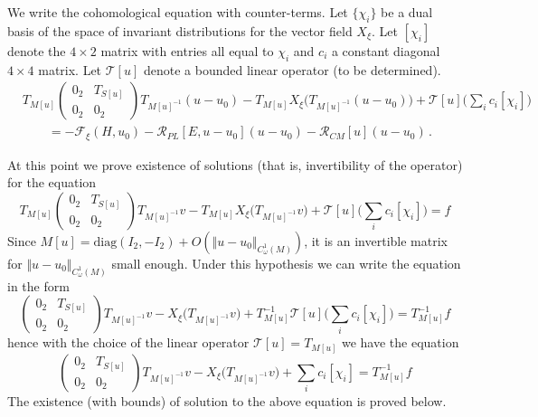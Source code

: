 \documentclass[11pt]{amsart}
\begin{document}
We write the cohomological equation with counter-terms. Let $\{\chi_i\}$ be a dual basis of the space of invariant distributions for the vector field $X_\xi$. 
Let $[\chi_i]$ denote the $4\times 2$ matrix with entries all equal to $\chi_i$ and $c_i$ a constant diagonal $4\times 4$ matrix.  Let  $\mathcal T[u]$
denote a bounded linear operator (to be determined).
\begin{equation}
\label{eq:para-cohom}
\begin{aligned}
&  T_{M[u]} \begin{pmatrix} 0_2 & T_{S[u]} \\ 0_2 & 0_2 \end{pmatrix} T_{M[u]^{-1}}  (u-u_0)  - 
T_{ M[u] } X_\xi \Big(T_{M[u]^{-1} }  (u-u_0) \Big)  + \mathcal T[u] \Big(  \sum_i  c_i [\chi_i]  \Big)  \\ &    
    \qquad = -\mathcal{F}_\xi(H, u_0) -\mathcal R_{PL}[E, u-u_0 ] (u-u_0) - \mathcal R_{CM}[u] (u-u_0)    \,.
\end{aligned}
\end{equation}

At this point we prove existence of solutions (that is, invertibility of the operator) for the equation
$$
 T_{M[u]} \begin{pmatrix} 0_2 & T_{S[u]} \\ 0_2 & 0_2 \end{pmatrix} T_{M[u]^{-1}}  v - 
T_{ M[u] } X_\xi \Big(T_{M[u]^{-1} }  v \Big)  + \mathcal T[u] \Big(  \sum_i  c_i [\chi_i]  \Big) = f
$$
Since $M[u]= \text{diag}(I_2, -I_2) + O( \Vert u -u_0 \Vert_{C^1_\omega(M)})$, it is an invertible matrix for $\Vert u -u_0 \Vert_{C^1_\omega(M)}$ small enough. 
Under this hypothesis we can write the equation in the form
$$
 \begin{pmatrix} 0_2 & T_{S[u]} \\ 0_2 & 0_2 \end{pmatrix} T_{M[u]^{-1}}  v - 
 X_\xi \Big(T_{M[u]^{-1} }  v \Big)  +  T_{M[u]}^{-1} \mathcal T[u] \Big(  \sum_i  c_i [\chi_i]  \Big) =  T_{M[u]}^{-1} f
$$
hence with the choice of the linear operator $\mathcal T[u] = T_{M[u]}$ we have the equation
$$
\begin{pmatrix} 0_2 & T_{S[u]} \\ 0_2 & 0_2 \end{pmatrix} T_{M[u]^{-1}}  v - 
 X_\xi \Big(T_{M[u]^{-1} }  v \Big)  +   \sum_i  c_i [\chi_i]   =  T_{M[u]}^{-1} f
$$
The existence (with bounds) of solution to the above equation  is proved below.
\end{document}
